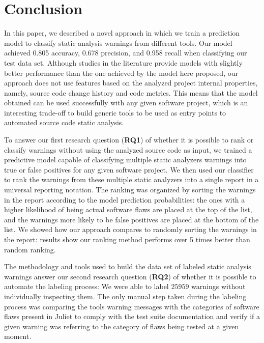 \chapter{Conclusion}

In this paper, we described a novel approach in which we train a prediction
model to classify static analysis warnings from different tools. Our model
achieved 0.805 accuracy, 0.678 precision, and 0.958 recall when classifying our
test data set.  Although studies in the literature provide models with slightly
better performance than the one achieved by the model here proposed, our
approach does not use features based on the analyzed project internal
properties, namely, source code change history and code metrics. This means
that the model obtained can be used successfully with any given software
project, which is an interesting trade-off to build generic tools to be used as
entry points to automated source code static analysis.

To answer our first research question (\textbf{RQ1}) of whether it is possible to rank or classify warnings
without using the analyzed source code as input, we trained a predictive model
capable of classifying multiple static analyzers warnings into true or false
positives for any given software project.
We then used our classifier to rank the warnings from these multiple static
analyzers into a single report in a universal reporting notation. The ranking
was organized by sorting the warnings in the report according to the model
prediction probabilities: the ones with a higher likelihood of being actual
software flaws are placed at the top of the list, and the warnings more likely
to be false positives are placed at the bottom of the list. We showed how our
approach compares to randomly sorting the warnings in the report: results show
our ranking method performs over 5 times better than random ranking.


The methodology and tools used to build the data set of labeled static analysis
warnings answer our second research question (\textbf{RQ2}) of whether it is
possible to automate the labeling process: We were able to 
label $25959$ warnings without individually inspecting them. The only manual step
taken during the labeling process was comparing the tools warning messages with
the categories of software flaws present in Juliet to comply with the test suite
documentation and verify if a given warning was referring to the category of flaws
being tested at a given moment.

